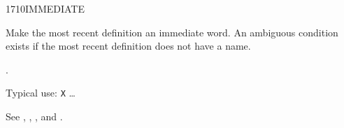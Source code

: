 \begin{worddef}{1710}{IMMEDIATE}
\item \stack{}{}

	Make the most recent definition an immediate word. An ambiguous
	condition exists if the most recent definition does not have a
	name.

\see {}.

	\begin{defer}
	\rationale %
		Typical use:
			\word{:} \texttt{X}
			{\ldots} \word{;} 

	\testing
		\rmfamily
		See ,
			,
			, and
			.
	\end{defer}
\end{worddef}


